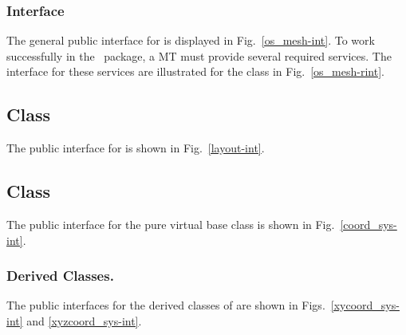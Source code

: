 \subsubsection{ Interface}

The general public interface for  is displayed in
Fig.~\ref{os_mesh-int}.    To work successfully in the
\imctest\ package, a MT must provide several required services.  The
interface for these services are illustrated for the 
class in Fig.~\ref{os_mesh-rint}.

\subsection{ Class}

The public interface for  is shown in
Fig.~\ref{layout-int}.

\subsection{ Class}

The public interface for the pure virtual base class 
is shown in Fig.~\ref{coord_sys-int}.

\subsubsection{ Derived Classes.}

The public interfaces for the derived classes of  are 
shown in Figs.~\ref{xycoord_sys-int} and \ref{xyzcoord_sys-int}.
